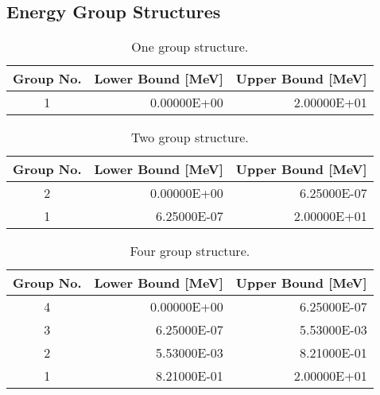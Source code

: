 \begin{appendices}

\chapter{Energy Group Structures}
\label{app:energy-groups}

\renewcommand{\arraystretch}{0.8}%

\begin{table}[h!]
  \centering
  \footnotesize
  \caption{One group structure.}
  \label{table:app-1-groups} 
  \vspace{14pt}
  \begin{tabular}{c r r}
    \toprule
    {\bf Group No.} &
    {\bf Lower Bound [MeV]} &
    {\bf Upper Bound [MeV]} \\
    \midrule
1 & 0.00000E+00 & 2.00000E+01 \\
    \bottomrule
   \end{tabular}
\end{table}

\begin{table}[h!]
  \centering
  \footnotesize
  \caption{Two group structure.}
  \label{table:app-2-groups} 
  \vspace{14pt}
  \begin{tabular}{c r r}
    \toprule
    {\bf Group No.} &
    {\bf Lower Bound [MeV]} &
    {\bf Upper Bound [MeV]} \\
    \midrule
2 & 0.00000E+00 & 6.25000E-07 \\
1 & 6.25000E-07 & 2.00000E+01 \\
  \bottomrule
 \end{tabular}
\end{table}

\begin{table}[h!]
  \centering
  \footnotesize
  \caption{Four group structure.}
  \label{table:app-4-groups} 
  \vspace{14pt}
  \begin{tabular}{c r r}
    \toprule
    {\bf Group No.} &
    {\bf Lower Bound [MeV]} &
    {\bf Upper Bound [MeV]} \\
    \midrule
4 & 0.00000E+00 & 6.25000E-07 \\
3 & 6.25000E-07 & 5.53000E-03 \\
2 & 5.53000E-03 & 8.21000E-01 \\
1 & 8.21000E-01 & 2.00000E+01 \\
  \bottomrule
 \end{tabular}
\end{table}


\end{appendices}

